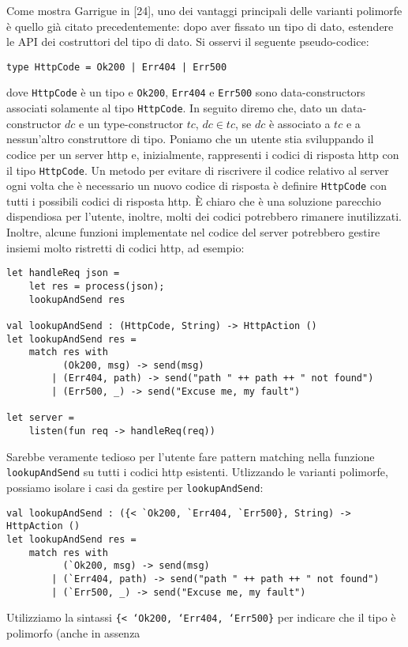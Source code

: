 \documentclass[10pt,a4paper]{article}
\begin{document}
Come mostra Garrigue in [24], uno dei vantaggi principali delle varianti polimorfe è quello già citato precedentemente:
dopo aver fissato un tipo di dato, estendere le API dei costruttori del tipo di dato. Si osservi il
seguente pseudo-codice:
\begin{lstlisting}
type HttpCode = Ok200 | Err404 | Err500
\end{lstlisting}
dove \texttt{HttpCode} è un tipo e \texttt{Ok200}, \texttt{Err404} e \texttt{Err500} sono data-constructors associati
solamente al tipo \texttt{HttpCode}. In seguito diremo che, dato un data-constructor $ dc $ e un type-constructor $ tc $,
$ dc \in tc $, se $ dc $ è associato a $ tc $ e a nessun'altro construttore di tipo. Poniamo che un utente stia
sviluppando il codice per un server http e, inizialmente, rappresenti i codici di risposta http con il tipo
\texttt{HttpCode}. Un metodo per evitare di riscrivere il codice relativo al server ogni volta che è necessario un nuovo
codice di risposta è definire \texttt{HttpCode} con tutti i possibili codici di risposta http. \`E chiaro che è una
soluzione parecchio dispendiosa per l'utente, inoltre, molti dei codici potrebbero rimanere inutilizzati. Inoltre,
alcune funzioni implementate nel codice del server potrebbero gestire insiemi molto ristretti di codici http, ad esempio:
\begin{lstlisting}
let handleReq json =
    let res = process(json);
    lookupAndSend res

val lookupAndSend : (HttpCode, String) -> HttpAction ()
let lookupAndSend res =
    match res with
          (Ok200, msg) -> send(msg)
        | (Err404, path) -> send("path " ++ path ++ " not found")
        | (Err500, _) -> send("Excuse me, my fault")

let server =
    listen(fun req -> handleReq(req))
\end{lstlisting}
Sarebbe veramente tedioso per l'utente fare pattern matching nella funzione \texttt{lookupAndSend} su tutti i codici
http esistenti. Utlizzando le varianti polimorfe, possiamo isolare i casi da gestire per \texttt{lookupAndSend}:
\begin{lstlisting}
val lookupAndSend : ({< `Ok200, `Err404, `Err500}, String) -> HttpAction ()
let lookupAndSend res =
    match res with
          (`Ok200, msg) -> send(msg)
        | (`Err404, path) -> send("path " ++ path ++ " not found")
        | (`Err500, _) -> send("Excuse me, my fault")
\end{lstlisting}
Utilizziamo la sintassi \texttt{\{< `Ok200, `Err404, `Err500\}} per indicare che il tipo è polimorfo (anche in assenza
\end{document}
